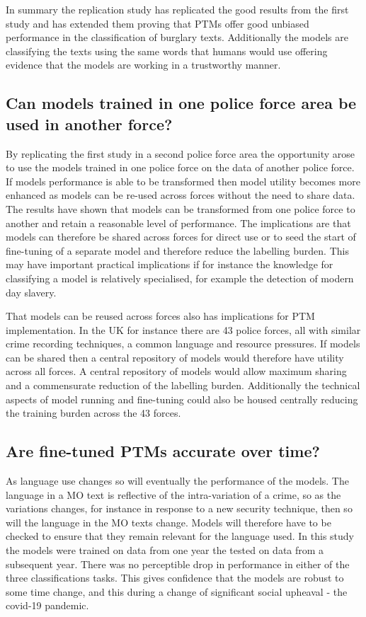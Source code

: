 In summary the replication study has replicated the good results from the first study and has extended them proving that PTMs offer good unbiased performance in the classification of burglary texts. Additionally the models are classifying the texts using the same words that humans would use offering evidence that the models are working in a trustworthy manner.


\subsection{Can models trained in one police force area be used in another force?} By replicating the first study in a second police force area the opportunity arose to use the models trained in one police force on the data of another police force. If models performance is able to be transformed then model utility becomes more enhanced as models can be re-used across forces without the need to share data. The results have shown that models can be transformed from one police force to another and retain a reasonable level of performance. The implications are that models can therefore be shared across forces for direct use or to seed the start of fine-tuning of a separate model and therefore reduce the labelling burden. This may have important practical implications if for instance the knowledge for classifying a model is relatively specialised, for example the detection of modern day slavery. 

That models can be reused across forces also has implications for PTM implementation. In the UK for instance there are 43 police forces, all with similar crime recording techniques, a common language and resource pressures. If models can be shared then a central repository of models would therefore have utility across all forces. A central repository of models would allow maximum sharing and a commensurate reduction of the labelling burden. Additionally the technical aspects of model running and fine-tuning could also be housed centrally reducing the training burden across the 43 forces.


\subsection{Are fine-tuned PTMs accurate over time?} As language use changes so will eventually the performance of the models. The language in a MO text is reflective of the intra-variation of a crime, so as the variations changes, for instance in response to a new security technique, then so will the language in the MO texts change. Models will therefore have to be checked to ensure that they remain relevant for the language used. In this study the models were trained on data from one year the tested on data from a subsequent year. There was no perceptible drop in performance in either of the three classifications tasks. This gives confidence that the models are robust to some time change, and this during a change of significant social upheaval - the covid-19 pandemic. 

